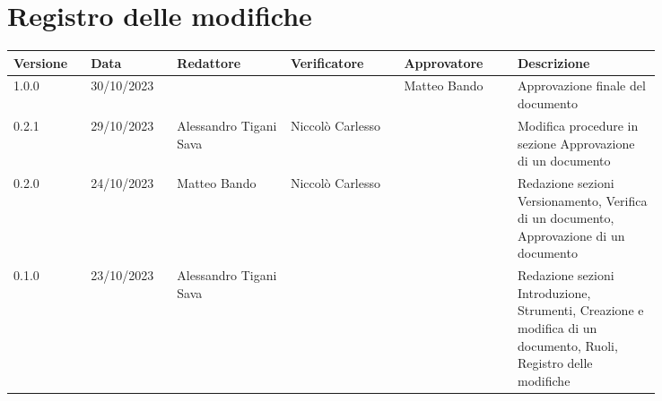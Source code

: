 \section*{Registro delle modifiche}
{
\renewcommand{\arraystretch}{1.5}
\scriptsize
\begin{tabular}{p{0.10\linewidth}p{0.10\linewidth}p{0.15\linewidth}p{0.15\linewidth}p{0.15\linewidth}p{0.19\linewidth}}
    \textbf{Versione}   & \textbf{Data} & \textbf{Redattore}        & \textbf{Verificatore} & \textbf{Approvatore}  & \textbf{Descrizione}  \\
    \hline
    1.0.0               & 30/10/2023    &                           &                       & Matteo Bando          & Approvazione finale del documento \\
    \hline
    0.2.1               & 29/10/2023    & Alessandro Tigani Sava           & Niccolò Carlesso      &                       & Modifica procedure in sezione Approvazione di un documento \\
    \hline
    0.2.0               & 24/10/2023    & Matteo Bando              & Niccolò Carlesso      &                       & Redazione sezioni Versionamento, Verifica di un documento, Approvazione di un documento   \\
    \hline
    0.1.0               & 23/10/2023    & Alessandro Tigani Sava    &                       &                       & Redazione sezioni Introduzione, Strumenti, Creazione e modifica di un documento, Ruoli, Registro delle modifiche \\
    \hline
\end{tabular}
}